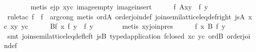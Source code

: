 \begin{isabellebody}
\ \ \ \ \ \ \isamarkupfalse%
\ {}metis\ ejp\ xyc\ image{}empty\ image{}insert{}\isanewline
\isanewline
\ \ \ \ \isamarkupfalse%
\ {}f\ {}{}\isactrlbsub Ax{}y{}{}\ {}\ f\ y{}\isanewline
\ \ \ \ \ \ \isamarkupfalse%
\ {}rule{}tac\ f\ {}\ f\ \ arg{}cong{}\ metis\ ord{}A\ order{}join{}def\ join{}semilattice{}leq{}def{}right\ js{}A\ xc\ xy\ yc{}\isanewline
\isanewline
\ \ \ \ \isamarkupfalse%
\ {}{}\isactrlbsub Bf\ x{}\ f\ y{}\ {}\ f\ y{}\isanewline
\ \ \ \ \ \ \isamarkupfalse%
\ {}metis\ xy{}join{}pres{}\isanewline
\isanewline
\ \ \ \ \isamarkupfalse%
\ {}f\ x\ {}\isactrlbsub B\isactrlesub \ f\ y{}\isanewline
\ \ \ \ \ \ \isamarkupfalse%
\ {}smt\ join{}semilattice{}leq{}def{}left\ js{}B\ typed{}application\ f{}closed\ xc\ yc\ ord{}B\ order{}join{}def{}\isanewline

\end{isabellebody}
